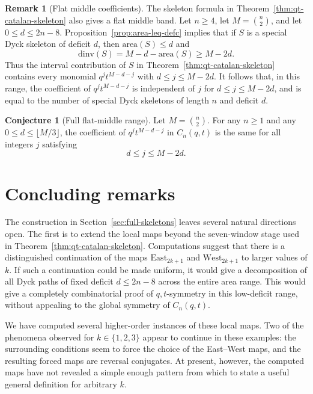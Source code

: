 \documentclass[11pt]{article}
\theoremstyle{plain}
\theoremstyle{definition}
\newtheorem{remark}[theorem]{Remark}
\newtheorem{conjecture}[theorem]{Conjecture}
\theoremstyle{remark}
\newcommand{\dinv}{\mathrm{dinv}}
\newcommand{\area}{\mathrm{area}}
\begin{document}
\begin{remark}[Flat middle coefficients]
\label{rem:flat-middle-coefficients}
The skeleton formula in Theorem~\ref{thm:qt-catalan-skeleton} also gives a
flat middle band.  Let \(n\ge 4\), let \(M=\binom n2\), and let
\(0\le d\le 2n-8\).  Proposition~\ref{prop:area-leq-defc} implies that if
\(S\) is a special Dyck skeleton of deficit \(d\), then
\(\area(S)\le d\) and
\[
  \dinv(S)=M-d-
  \area(S)\ge M-2d.
\]
Thus the interval contribution of \(S\) in
Theorem~\ref{thm:qt-catalan-skeleton} contains every monomial
\(q^j t^{M-d-j}\) with \(d\le j\le M-2d\).  It follows that, in this range, the
coefficient of \(q^j t^{M-d-j}\) is independent of \(j\) for
\(d\le j\le M-2d\), and is equal to the number of special Dyck skeletons of
length \(n\) and deficit \(d\).
\end{remark}
\begin{conjecture}[Full flat-middle range]
\label{conj:middle-coefficients}
Let \(M=\binom n2\).  For any \(n\ge 1\) and any
\(0\le d\le \lfloor M/3\rfloor\), the coefficient of \(q^j t^{M-d-j}\) in
\(C_n(q,t)\) is the same for all integers \(j\) satisfying
\[
  d\le j\le M-2d.
\]
\end{conjecture}


\section{Concluding remarks}
\label{sec:concluding-remarks}

The construction in Section~\ref{sec:full-skeletons} leaves several natural
directions open.  The first is to extend the local maps beyond the seven-window
stage used in Theorem~\ref{thm:qt-catalan-skeleton}.  Computations suggest that
there is a distinguished continuation of the maps
\(\mathrm{East}_{2k+1}\) and \(\mathrm{West}_{2k+1}\) to larger values of
\(k\).  If such a continuation could be made uniform, it would give a
decomposition of all Dyck paths of fixed deficit \(d\le 2n-8\) across the
entire area range.  This would give a completely combinatorial proof of
\(q,t\)-symmetry in this low-deficit range, without appealing to the global
symmetry of \(C_n(q,t)\).

We have computed several higher-order instances of these local maps.  Two of
the phenomena observed for \(k\in\{1,2,3\}\) appear to continue in these
examples: the surrounding conditions seem to force the choice of the East--West
maps, and the resulting forced maps are reversal conjugates.  At present,
however, the computed maps have not revealed a simple enough pattern from which
to state a useful general definition for arbitrary \(k\).
\end{document}
